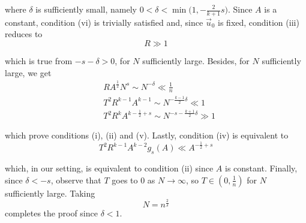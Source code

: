 \documentclass[letterpaper, 11pt,  reqno]{amsart}
\newcommand{\1}{\hspace{0.5mm}\text{I}\hspace{0.5mm}}
\newcommand{\noi}{\noindent}
\newcommand{\dl}{\delta}
\numberwithin{equation}{section}
\numberwithin{theorem}{section}
\begin{document}
\noi where $\dl$ is sufficiently small, namely $0 < \dl < \min \big(1, -\frac{2}{k+1}s \big)$. Since $A$ is a constant, condition (vi) is trivially satisfied and, since $\vec{u}_0$ is fixed, condition (iii) reduces to
$$
R \gg 1 $$

\noi which is true from $-s - \dl > 0$, for $N$ sufficiently large. Besides, for $N$ sufficiently large, we get
\begin{align*}
& RA^{\frac 12} N^s \sim N^{-\dl} \ll \frac 1n \\
& T^2 R^{k-1} A^{k-1} \sim N^{- \frac{k-1}{2} \dl} \ll 1 \\
& T^2 R^k A^{k - \frac 12 + s} \sim N^{-s - \frac{k+1}{2}\dl} \gg 1
\end{align*}

\noi which prove conditions (i), (ii) and (v). Lastly, condition (iv) is equivalent to 
$$
 T^2 R^{k-1} A^{k - 2}g_s(A) \ll A^{-\frac 12 + s}
$$

\noi which, in our setting, is equivalent to condition (ii) since $A$ is constant. Finally, since $\dl < -s$, observe that $T$ goes to $0$ as $N \to \infty$, so $T \in (0, \frac 1n )$ for $N$ sufficiently large. Taking
$$
N = n^{\frac 2 \dl}
$$
completes the proof since $\dl < 1$.
\end{document}
